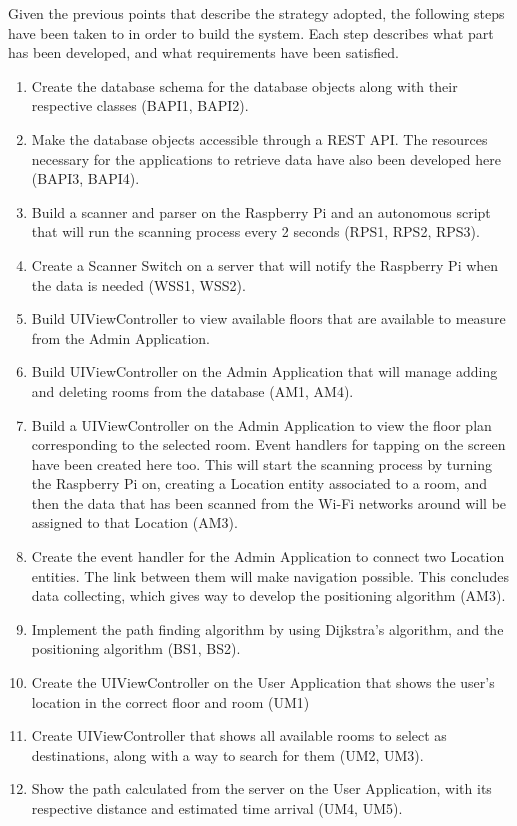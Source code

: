 Given the previous points that describe the strategy adopted, the following steps have been taken to in order to build the system. Each step describes what part has been developed, and what requirements have been satisfied.
\begin{enumerate}
    \item Create the database schema for the database objects along with their respective classes (BAPI1, BAPI2).
    \item Make the database objects accessible through a REST API. The resources necessary for the applications to retrieve data have also been developed here (BAPI3, BAPI4).
    \item Build a scanner and parser on the Raspberry Pi and an autonomous script that will run the scanning process every 2 seconds (RPS1, RPS2, RPS3).
    \item Create a Scanner Switch on a server that will notify the Raspberry Pi when the data is needed (WSS1, WSS2).
    \item Build UIViewController to view available floors that are available to measure from the Admin Application.
    \item Build UIViewController on the Admin Application that will manage adding and deleting rooms from the database (AM1, AM4).
    \item Build a UIViewController on the Admin Application to view the floor plan corresponding to the selected room. Event handlers for tapping on the screen have been created here too. This will start the scanning process by turning the Raspberry Pi on, creating a Location entity associated to a room, and then the data that has been scanned from the Wi-Fi networks around will be assigned to that Location (AM3).
    \item Create the event handler for the Admin Application to connect two Location entities. The link between them will make navigation possible. This concludes data collecting, which gives way to develop the positioning algorithm (AM3).
    \item Implement the path finding algorithm by using Dijkstra's algorithm, and the positioning algorithm (BS1, BS2).
    \item Create the UIViewController on the User Application that shows the user's location in the correct floor and room (UM1)
    \item Create  UIViewController that shows all available rooms to select as destinations, along with a way to search for them (UM2, UM3).
    \item Show the path calculated from the server on the User Application, with its respective distance and estimated time arrival (UM4, UM5).

\end{enumerate}

